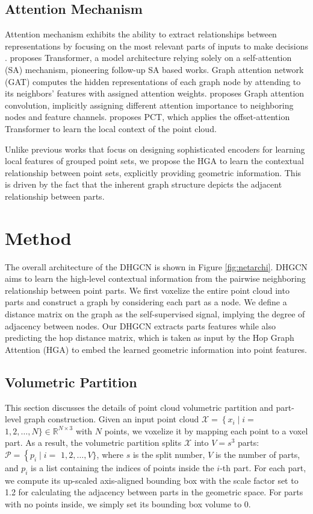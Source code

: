 \documentclass[letterpaper]{article}
\begin{document}
\subsection{Attention Mechanism}
Attention mechanism exhibits the ability to extract relationships between representations by focusing on the most relevant parts of inputs to make decisions \cite{pointmlp}.
\citet{vaswani2017attention} proposes Transformer, a model architecture relying solely on a self-attention (SA) mechanism, pioneering follow-up SA based works.
Graph attention network (GAT) \cite{gat} computes the hidden representations of each graph node by attending to its neighbors' features with assigned attention weights. \citet{wang2019graphattenconv} proposes Graph attention convolution, implicitly assigning different attention importance to neighboring nodes and feature channels.
\citet{guo2021pct} proposes PCT, which applies the offset-attention Transformer to learn the local context of the point cloud.

Unlike previous works that focus on designing sophisticated encoders for learning local features of grouped point sets, we propose the HGA to learn the contextual relationship between point sets, explicitly providing geometric information. This is driven by the fact that the inherent graph structure depicts the adjacent relationship between parts.


\section{Method}
\label{sec:method}
The overall architecture of the DHGCN is shown in Figure \ref{fig:netarchi}.
DHGCN aims to learn the high-level contextual information from the pairwise neighboring relationship between point parts.
We first voxelize the entire point cloud into parts and construct a graph by considering each part as a node. We define a distance matrix on the graph as the self-supervised signal, implying the degree of adjacency between nodes.
Our DHGCN extracts parts features while also predicting the hop distance matrix, which is taken as input by the Hop Graph Attention (HGA) to embed the learned geometric information into point features.


\subsection{Volumetric Partition}
\label{sec:volumetricpartition}
This section discusses the details of point cloud volumetric partition and part-level graph construction.
Given an input point cloud \(\mathcal{X}=\left\{x_{i} \mid i=\right.\) \(1,2, \ldots, N\} \in \mathbb{R}^{N \times 3}\) with \(N\) points, we voxelize it by mapping each point to a voxel part.
As a result, the volumetric partition splits \(\mathcal{X}\) into \(V={s}^3\) parts: \(\mathcal{P}=\left\{p_{i} \mid i=\right.\) \(1,2, \ldots, V\}\), where \(s\) is the split number, \(V\) is the number of parts, and \(p_i\) is a list containing the indices of points inside the \(i\)-th part.
For each part, we compute its up-scaled axis-aligned bounding box with the scale factor set to 1.2 for calculating the adjacency between parts in the geometric space. For parts with no points inside, we simply set its bounding box volume to 0.
\end{document}
